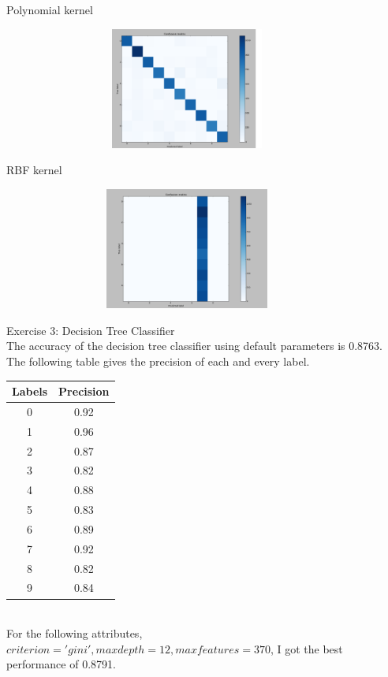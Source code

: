 \documentclass[12pt]{article}
\begin{document}
Polynomial kernel
\begin{figure}[h]
\centering
\includegraphics[width=10cm, height=4cm]{3}
\end{figure}

RBF kernel
\begin{figure}[h]
\centering
\includegraphics[width=10cm, height=4cm]{4}
\end{figure}

\newpage

Exercise 3: Decision Tree Classifier \\

The accuracy of the decision tree classifier using default parameters is 0.8763. The following table gives the precision of each and every label.

\begin{tabular}{|c|c|}
\hline 
Labels & Precision \\ 
\hline 
0 & 0.92 \\ 
\hline 
1 & 0.96 \\ 
\hline 
2 & 0.87 \\ 
\hline 
3 & 0.82 \\ 
\hline 
4 & 0.88 \\ 
\hline 
5 & 0.83 \\ 
\hline 
6 & 0.89 \\ 
\hline 
7 & 0.92 \\ 
\hline 
8 & 0.82 \\ 
\hline 
9 & 0.84 \\ 
\hline 
\end{tabular} 
\\

For the following attributes, $criterion='gini',max depth=12, max features=370$, I got the best performance of 0.8791.
\end{document}
